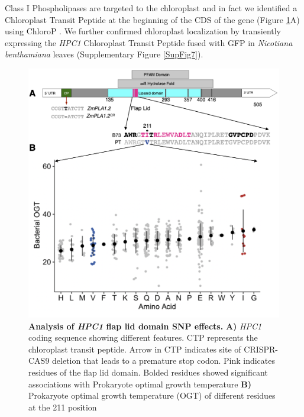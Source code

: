 \documentclass[9pt,twocolumn,twoside,lineno]{BioRxiv}
\begin{document}
Class I Phospholipases are targeted to the chloroplast and in fact we identified a Chloroplast Transit Peptide at the beginning of the CDS of the gene (Figure \ref{Fig5}A) using ChloroP \cite{Emanuelsson1999-rs}.
We further confirmed chloroplast localization by transiently expressing  the \textit{HPC1} Chloroplast Transit Peptide fused with GFP in \textit{Nicotiana benthamiana} leaves (Supplementary Figure \ref{SupFig7}).

\begin{figure}[!ht]
\begin{center}
\includegraphics[width=0.4\paperwidth]{Figures/Fig_5.png}
\caption{\textbf{Analysis of \textit{HPC1} flap lid domain SNP effects.}  
\textbf{A)} \textit{HPC1} coding sequence showing different features. 
CTP represents the chloroplast transit peptide. 
Arrow in CTP indicates site of CRISPR-CAS9 deletion that leads to a premature stop codon.
Pink indicates residues of the flap lid domain.
Bolded residues showed significant associations with Prokaryote optimal growth temperature 
\textbf{B)} Prokaryote optimal growth temperature (OGT) of different residues at the 211 position}
\label{Fig5}
\end{center}
\end{figure}
\end{document}
